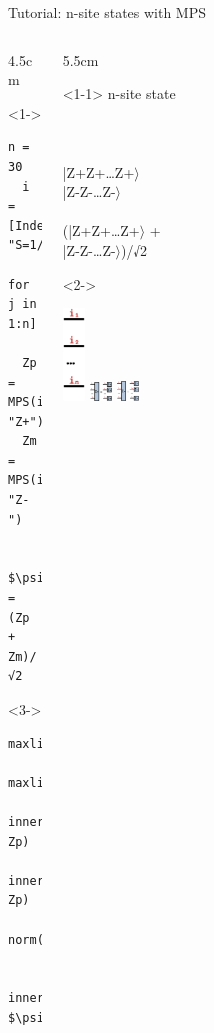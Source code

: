 \begin{frame}[fragile]{Tutorial: n-site states with MPS}

\begin{columns}

\begin{column}{4.5cm}

\begin{onlyenv}<1->
\begin{lstlisting}[language=JuliaLocal, style=julia, mathescape, basicstyle=\small]
  n = 30
  i = [Index(2, "S=1/2")
        for j in 1:n]

  Zp = MPS(i, "Z+")
  Zm = MPS(i, "Z-")

  $\psi$ = (Zp + Zm)/√2
 \end{lstlisting}
\end{onlyenv}

\begin{onlyenv}<3->
\begin{lstlisting}[language=JuliaLocal, style=julia, mathescape, basicstyle=\small]
  maxlinkdim(Zp)
  maxlinkdim($\psi$)
  inner(Zp, Zp)
  inner(Zm, Zp)
  norm($\psi$)

  inner(Zp, $\psi$)
\end{lstlisting}
\end{onlyenv}

\end{column}

\begin{column}{5.5cm}

\begin{onlyenv}<1-1>
n-site state \\
~\\
~\\
~\\
|Z+Z+…Z+$\rangle$ \\
|Z-Z-…Z-$\rangle$ \\
~\\
(|Z+Z+…Z+$\rangle$ + \\
 |Z-Z-…Z-$\rangle$)/√2
\end{onlyenv}

\begin{onlyenv}<2->
\vspace*{0.0cm}
\begin{center}
\includegraphics[width=0.05\textwidth]{
  slides/assets/in.png
}
\includegraphics[width=0.05\textwidth]{
  slides/assets/Zpn.png
}
\includegraphics[width=0.05\textwidth]{
  slides/assets/Zmn.png
}
\end{center}
\vspace*{0.0cm}
\end{onlyenv}


\end{column}
\end{columns}
\end{frame}

